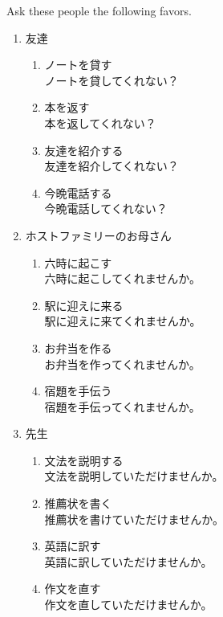 \documentclass[notoc,notitlepage]{tufte-book}
\begin{document}
\begin{ex}
  Ask these people the following favors.

  \begin{enumerate}
    \item 友達
      \begin{enumerate}
        \item ノートを貸す \\
          ノートを貸してくれない？
        \item 本を返す \\
          本を返してくれない？
        \item 友達を紹介する \\
          友達を紹介してくれない？
        \item 今晩電話する \\
          今晩電話してくれない？
      \end{enumerate}
    \item ホストファミリーのお母さん
      \begin{enumerate}
        \item 六時に起こす \\
          六時に起こしてくれませんか。
        \item 駅に迎えに来る \\
          駅に迎えに来てくれませんか。
        \item お弁当を作る \\
          お弁当を作ってくれませんか。
        \item 宿題を手伝う \\
          宿題を手伝ってくれませんか。
      \end{enumerate}
    \item 先生
      \begin{enumerate}
        \item 文法を説明する \\
          文法を説明していただけませんか。
        \item 推薦状を書く \\
          推薦状を書けていただけませんか。
        \item 英語に訳す \\
          英語に訳していただけませんか。
        \item 作文を直す \\
          作文を直していただけませんか。
      \end{enumerate}
  \end{enumerate}
\end{ex}
\end{document}
